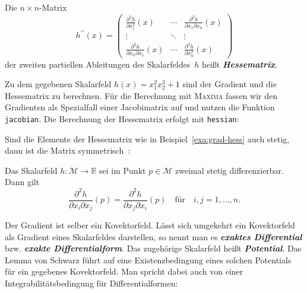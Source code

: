 Die $n\times n$-Matrix
\[
h^{\prime\prime}(x)=\left(\begin{array}{ccc}
\frac{\partial^{2}h}{\partial x_{1}^{2}}(x) & \cdots & \frac{\partial^{2}h}{\partial x_{1}\partial x_{n}}(x)\\
\vdots & \ddots & \vdots\\
\frac{\partial^{2}h}{\partial x_{n}\partial x_{1}}(x) & \cdots & \frac{\partial^{2}h}{\partial x_{n}^{2}}(x)
\end{array}\right)
\]
der zweiten partiellen Ableitungen des Skalarfeldes~$h$ heißt \textbf{\em Hessematrix}.
\begin{example}
\label{exa:grad-hess}Zu dem gegebenen Skalarfeld $h(x)=x_{1}^{2}x_{2}^{3}+1$
sind der Gradient und die Hessematrix zu berechnen. Für die Berechnung
mit \textsc{Maxima} fassen wir den Gradienten als Spezialfall einer
Jacobimatrix auf und nutzen die Funktion \texttt{jacobian}. Die Berechnung
der Hessematrix erfolgt mit \texttt{hessian}:


\end{example}
Sind die Elemente der Hessematrix wie in Beispiel~\ref{exa:grad-hess}
auch stetig, dann ist die Matrix symmetrisch~\cite{koenigsberger2-2004}:

\begin{lemma}
\label{lem:Schwarz}Das
Skalarfeld $h:\mathcal{M}\to{\mathbb{R}}$ sei im Punkt $p\in\mathcal{M}$ zweimal
stetig differenzierbar. Dann gilt
\begin{equation}
\frac{\partial^{2}h}{\partial x_{i}\partial x_{j}}(p)=\frac{\partial^{2}h}{\partial x_{j}\partial x_{i}}(p)\quad\textrm{für}\quad i,j=1,\ldots,n.\label{eq:lemma-schwarz}
\end{equation}
\end{lemma}
Der Gradient ist selber ein Kovektorfeld. Lässt sich umgekehrt ein
Kovektorfeld als Gradient eines Skalarfeldes darstellen, so nennt
man es \textbf{\em exaktes Differential} bzw.
\textbf{\em exakte Differentialform}. Das
zugehörige Skalarfeld heißt \textbf{\em Potential}.
Das
Lemma von Schwarz führt auf eine Existenzbedingung eines solchen Potentials
für ein gegebenes Kovektorfeld. Man spricht dabei auch von einer Integrabilitätsbedingung
für Differentialformen:


